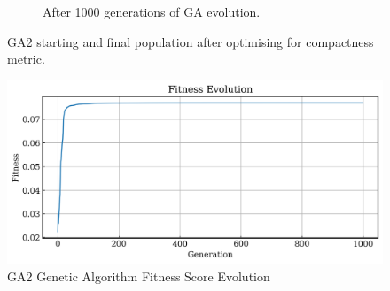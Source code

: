\documentclass{article}
\begin{document}
\begin{figure}[H]
\begin{subfigure}[b]{0.45\textwidth}
        \caption{After 1000 generations of GA evolution.}
        \label{fig:GA2_final}
    \end{subfigure}
    \caption{GA2 starting and final population after optimising for compactness metric.}
    \label{fig:GA2_before_after_GA}
\end{figure}

\begin{figure}[H]
    \centering
    \includegraphics[width=0.75\linewidth]{figures/GAResults/GA2/1000gens_10pars_100initpop_5pcent_mut.png}
    \caption{GA2 Genetic Algorithm Fitness Score Evolution}
    \label{fig:GA2_fitness}
\end{figure}
\end{document}
